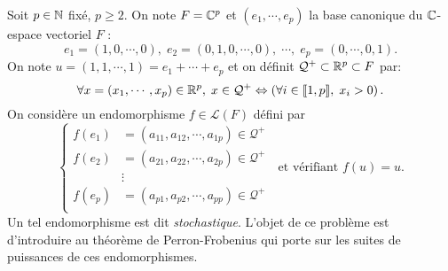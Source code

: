 \noindent
Soit $p\in \mathbb{N}$ fixé, $p\geq2$. On note $F = \mathbb{C}^p$ et $(e_1,\cdots,e_p)$ la base canonique du $\mathbb{C}$-espace vectoriel $F$ :
\begin{displaymath}
 e_1=(1,0,\cdots,0),\;e_2=(0,1,0,\cdots,0),\;\cdots,\; e_p=(0,\cdots,0,1).
\end{displaymath}
On note $u=(1,1,\cdots,1)=e_1+\cdots +e_p$ et on définit $\mathcal{Q}^+ \subset \mathbb{R}^p \subset F$ par: 
\[
  \forall x = (x_1,\cdots,x_p)\in \mathbb{R}^p,\; x\in \mathcal{Q}^+ \Leftrightarrow \left( \forall i \in \llbracket 1,p \rrbracket,\; x_i > 0\right).
\]
On considère un endomorphisme $f\in \mathcal{L}(F)$ défini par 
\[
\left\lbrace
\begin{aligned}
 f(e_1) &= (a_{1 1},a_{1 2},\cdots,a_{1 p}) \in \mathcal{Q}^+ \\
 f(e_2) &= (a_{2 1},a_{2 2},\cdots,a_{2 p}) \in \mathcal{Q}^+ \\
 &\vdots \\
 f(e_p) &= (a_{p 1},a_{p 2},\cdots,a_{p p}) \in \mathcal{Q}^+ \\
\end{aligned}
\right. \; \text{ et vérifiant } f(u) = u.
\]
Un tel endomorphisme est dit \emph{stochastique}. L'objet de ce problème est d'introduire au théorème de Perron-Frobenius qui porte sur les suites de puissances de ces endomorphismes.

